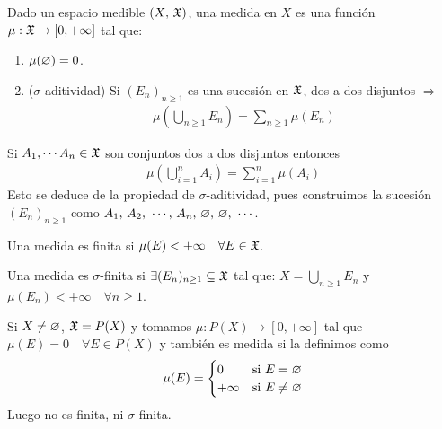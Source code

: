 \begin{definition}[Medida]
    Dado un espacio medible $(X\text{, } \mathfrak{X})$, una medida en $X$ es una función $\mu : \mathfrak{X} \to [0, +\infty]$ tal que:
    \begin{enumerate}
        \item $\mu(\varnothing) = 0$.
        \item ($\sigma$-aditividad) Si $(E_n)_{n \geq 1}$ es una sucesión en $\mathfrak{X}$, dos a dos disjuntos $\Rightarrow$ \begin{align*}
                  \mu(\bigcup_{n \geq 1} E_n) = \sum_{n \geq 1} \mu(E_n)
              \end{align*}
    \end{enumerate}
\end{definition}

\begin{note}
    Si $A_1, \cdots A_n \in \mathfrak{X}$ son conjuntos dos a dos disjuntos entonces \begin{align*}
        \mu(\bigcup_{i = 1}^n A_i) = \sum_{i = 1}^n \mu(A_i)
    \end{align*}
    Esto se deduce de la propiedad de $\sigma$-aditividad, pues construimos la sucesión $(E_n)_{n \geq 1}$ como $A_1\text{, } A_2\text{, } \cdots\text{, } A_n\text{, } \varnothing\text{, } \varnothing\text{, } \cdots$.
\end{note}

\begin{definition}
    Una medida es finita si $\mu(E) < +\infty \quad \forall E \in \mathfrak{X}$.
\end{definition}

\begin{definition}
    Una medida es $\sigma$-finita si $\exists (E_n)_{n \geq 1} \subseteq \mathfrak{X}$ tal que: $X = \bigcup_{n \geq 1} E_n$ y $\mu(E_n) < +\infty \quad \forall n \geq 1$.
\end{definition}

\begin{eg}
    Si $X \neq \varnothing$, $\mathfrak{X} = P(X)$ y tomamos $\mu : P(X) \to [0, +\infty]$ tal que $\mu(E) = 0 \quad \forall E \in P(X)$ y también es medida si la definimos como \begin{align*}
        \mu(E) = \begin{cases}
                     0       & \text{si } E = \varnothing    \\
                     +\infty & \text{si } E \neq \varnothing
                 \end{cases}
    \end{align*}
    Luego no es finita, ni $\sigma$-finita.
\end{eg}

